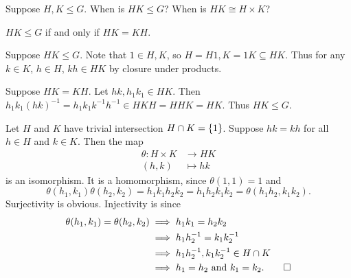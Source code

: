 \begin{exercise*} \label{thm:products}
    Suppose $H, K \le G$.
    When is $HK \le G$?
    When is $HK \cong H \times K$?
\end{exercise*}
\begin{solution}
    \begin{claim}
        $HK \le G$ if and only if $HK = KH$.
    \end{claim}
    \begin{subproof}[Proof]
        Suppose $HK \le G$.
        Note that $1 \in H, K$, so $H = H1, K = 1K \subseteq HK$.
        Thus for any $k \in K$, $h \in H$,
        $kh \in HK$ by closure under products.

        Suppose $HK = KH$.
        Let $hk, h_1k_1 \in HK$.
        Then $h_1k_1(hk)^{-1} = h_1k_1k^{-1}h^{-1} \in HKH = HHK = HK$.
        Thus $HK \le G$.
    \end{subproof}

    Let $H$ and $K$ have trivial intersection $H \cap K = \{1\}$.
    Suppose $hk = kh$ for all $h \in H$ and $k \in K$.
    Then the map \begin{align*}
        \theta\colon H \times K &\to HK \\
        (h, k) &\mapsto hk
    \end{align*} is an isomorphism.
    It is a homomorphism, since $\theta(1, 1) = 1$ and \[
        \theta(h_1, k_1)\theta(h_2, k_2)
            = h_1k_1h_2k_2
            = h_1h_2k_1k_2
            = \theta(h_1h_2, k_1k_2).
    \] Surjectivity is obvious.
    Injectivity is since \begin{align*}
        \theta(h_1, k_1) = \theta(h_2, k_2)
            &\implies h_1k_1 = h_2k_2 \\
            &\implies h_1 h_2^{-1} = k_1 k_2^{-1} \\
            &\implies h_1 h_2^{-1}, k_1 k_2^{-1} \in H \cap K \\
            &\implies h_1 = h_2 \text{ and } k_1 = k_2. \qedhere
    \end{align*}
\end{solution}
